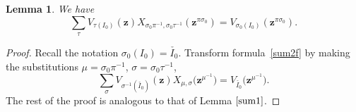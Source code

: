 \documentclass[10pt,a4paper]{amsart}
\numberwithin{equation}{section}
\newtheorem{Lemma}[Theorem]{Lemma}
\begin{document}
\begin{Lemma}\label{sum2} We have
\begin{equation}\label{sum2f}
\sum_{\tau}V_{\tau(I_0)}(\boldsymbol{z})X_{\sigma_0\pi^{-1},\sigma_0\tau^{-1}}(\boldsymbol{z}^{\pi\sigma_0})=V_{\sigma_0(I_0)}(\boldsymbol{z}^{\pi\sigma_0}).
\end{equation}
\end{Lemma}
\begin{proof}
Recall the notation $\sigma_0(I_0)=\check{I_0}$. Transform formula~\eqref{sum2f} by making the substitutions $\mu=\sigma_0\pi^{-1}$, $\sigma=\sigma_0\tau^{-1}$,{\samepage
\begin{equation}\label{sum2fn}
\sum_{\sigma}V_{\sigma^{-1}(\check{I_0})}(\boldsymbol{z})X_{\mu, \sigma }\bigl(\boldsymbol{z}^{\mu^{-1}}\bigr)=V_{\check{I_0}}\bigl(\boldsymbol{z}^{\mu^{-1}}\bigr).
\end{equation}
The rest of the proof is analogous to that of Lemma $\ref{sum1}$.}


\end{proof}
\end{document}
